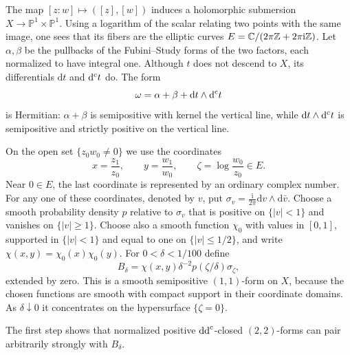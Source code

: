 The map $[z:w]\mapsto([z],[w])$ induces a holomorphic submersion
$X\to\mathbb P^1\times\mathbb P^1$. Using a logarithm of the scalar relating two points with the same image, one sees that its fibers are the elliptic curves
$E=\mathbb C/(2\pi\mathbb Z+2\pi\mathrm{i}\mathbb Z)$. Let $\alpha,\beta$ be the pullbacks of the Fubini--Study forms of the two factors, each normalized to have integral one. Although $t$ does not descend to $X$, its differentials $\mathrm dt$ and $\mathrm d^{\mathrm c} t$ do. The form
\begin{equation}\label{eq:lower-mass-quotient-metric}
 \omega=\alpha+\beta+\mathrm{d}t\wedge\mathrm d^{\mathrm c} t
\end{equation}
is Hermitian: $\alpha+\beta$ is semipositive with kernel the vertical line, while $\mathrm{d}t\wedge\mathrm d^{\mathrm c} t$ is semipositive and strictly positive on the vertical line.

On the open set $\{z_0w_0\ne0\}$ we use the coordinates
\[
 x=\frac{z_1}{z_0},\qquad y=\frac{w_1}{w_0},\qquad
 \zeta=\log\frac{w_0}{z_0}\in E.
\]
Near $0\in E$, the last coordinate is represented by an ordinary complex number. For any one of these coordinates, denoted by $v$, put
$\sigma_v=\frac{\mathrm{i}}{2\pi}\mathrm{d}v\wedge\mathrm{d}\bar v$.
Choose a smooth probability density $p$ relative to $\sigma_v$ that is positive on $\{|v|<1\}$ and vanishes on $\{|v|\geq1\}$. Choose also a smooth function $\chi_0$ with values in $[0,1]$, supported in $\{|v|<1\}$ and equal to one on $\{|v|\leq1/2\}$, and write $\chi(x,y)=\chi_0(x)\chi_0(y)$. For $0<\delta<1/100$ define
\[
 B_\delta=\chi(x,y)\delta^{-2}p(\zeta/\delta)\sigma_\zeta,
\]
extended by zero. This is a smooth semipositive $(1,1)$-form on $X$, because the chosen functions are smooth with compact support in their coordinate domains. As $\delta\downarrow0$ it concentrates on the hypersurface $\{\zeta=0\}$.

The first step shows that normalized positive $\mathrm{dd}^{\mathrm{c}}$-closed $(2,2)$-forms can pair arbitrarily strongly with $B_\delta$.

